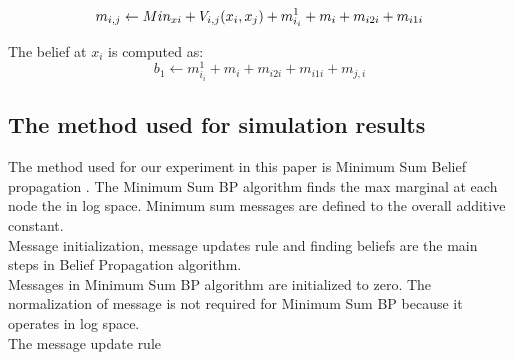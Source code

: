 \documentclass{singlecol-new}
\theoremstyle{TH}{
\newtheorem{lemma}{Lemma}
\newtheorem{theorem}[lemma]{Theorem}
\newtheorem{corrolary}[lemma]{Corrolary}
\newtheorem{conjecture}[lemma]{Conjecture}
\newtheorem{proposition}[lemma]{Proposition}
\newtheorem{claim}[lemma]{Claim}
\newtheorem{stheorem}[lemma]{Wrong Theorem}
\newtheorem{algorithm}{Algorithm}
}
\theoremstyle{THrm}{
\newtheorem{definition}{Definition}[section]
\newtheorem{question}{Question}[section]
\newtheorem{remark}{Remark}
\newtheorem{scheme}{Scheme}
}
\theoremstyle{THhit}{
\newtheorem{case}{Case}[section]
}
\begin{document}
\begin{equation}\label{}
m_{i,j}\leftarrow Min_{xi} + V_{i,j}(x_{i},x_{j})+  m^{1}_{i_i} +  m_{i}+ m_{i2i} +  m_{i1i} \\
\end{equation}








The belief at $x_{i}$ is computed as:
\begin{equation}\label{}
b_{1}\leftarrow m^{1}_{i_i} +  m_{i}+ m_{i2i} + m_{i1i} + m_{j,i}
\end{equation}








































\subsection{The method used for simulation results}








The method used for our experiment in this paper is Minimum Sum Belief propagation .  The Minimum Sum BP algorithm finds the max marginal at each node the in log space. Minimum sum messages are defined to the overall additive constant.\\  Message initialization, message updates rule and finding beliefs are the main steps in Belief Propagation algorithm.\\
Messages in Minimum Sum BP algorithm are initialized to zero. The normalization of   message is not required for Minimum Sum BP because it operates in log space.\\
The message update rule
\end{document}
